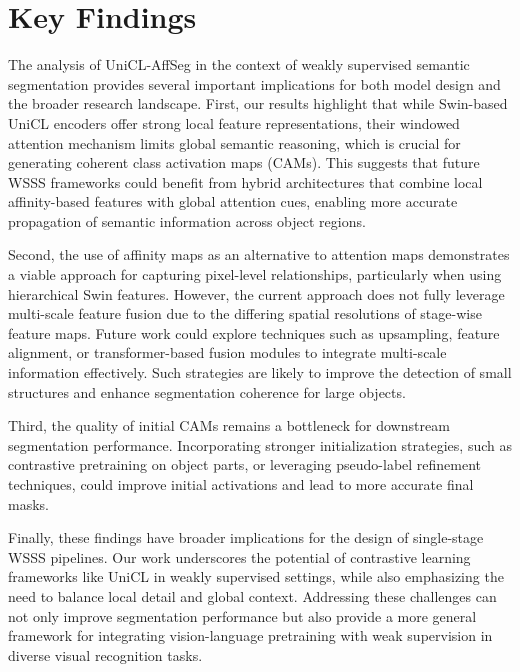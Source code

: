 \section{Key Findings}
\label{sec:key_findings}

The analysis of UniCL-AffSeg  in the context of weakly supervised semantic segmentation provides several important implications for both model design and the broader research landscape. First, our results highlight that while Swin-based UniCL encoders offer strong local feature representations, their windowed attention mechanism limits global semantic reasoning, which is crucial for generating coherent class activation maps (CAMs). This suggests that future WSSS frameworks could benefit from hybrid architectures that combine local affinity-based features with global attention cues, enabling more accurate propagation of semantic information across object regions.  

Second, the use of affinity maps as an alternative to attention maps demonstrates a viable approach for capturing pixel-level relationships, particularly when using hierarchical Swin features. However, the current approach does not fully leverage multi-scale feature fusion due to the differing spatial resolutions of stage-wise feature maps. Future work could explore techniques such as upsampling, feature alignment, or transformer-based fusion modules to integrate multi-scale information effectively. Such strategies are likely to improve the detection of small structures and enhance segmentation coherence for large objects.  

Third, the quality of initial CAMs remains a bottleneck for downstream segmentation performance. Incorporating stronger initialization strategies, such as contrastive pretraining on object parts, or leveraging pseudo-label refinement techniques, could improve initial activations and lead to more accurate final masks.  

Finally, these findings have broader implications for the design of single-stage WSSS pipelines. Our work underscores the potential of contrastive learning frameworks like UniCL in weakly supervised settings, while also emphasizing the need to balance local detail and global context. Addressing these challenges can not only improve segmentation performance but also provide a more general framework for integrating vision-language pretraining with weak supervision in diverse visual recognition tasks.  

